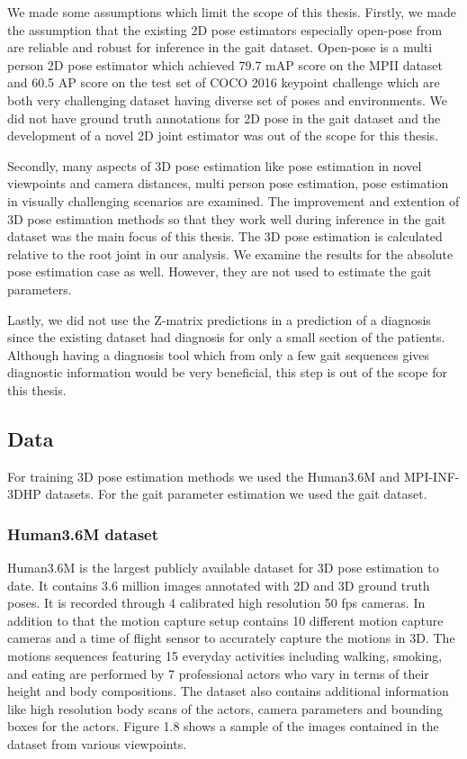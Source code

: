 We made some assumptions which limit the scope of this thesis. Firstly, we made the assumption that the existing 2D pose estimators especially open-pose from \parencite{cao2016realtime} are reliable and robust for inference in the gait dataset. Open-pose is a multi person 2D pose estimator which achieved 79.7 mAP score on the MPII dataset and 60.5 AP score on the test set of COCO 2016 keypoint challenge which are both very challenging dataset having diverse set of poses and environments. We did not have ground truth annotations for 2D pose in the gait dataset and the development of a novel 2D joint estimator was out of the scope for this thesis.

Secondly, many aspects of 3D pose estimation like pose estimation in novel viewpoints and camera distances, multi person pose estimation, pose estimation in visually challenging scenarios are examined. The improvement and extention of 3D pose estimation methods so that they work well during inference in the gait dataset was the main focus of this thesis. The 3D pose estimation is calculated relative to the root joint in our analysis. We examine the results for the absolute pose estimation case as well. However, they are not used to estimate the gait parameters.

Lastly, we did not use the Z-matrix predictions in a prediction of a diagnosis since the existing dataset had diagnosis for only a small section of the patients. Although having a diagnosis tool which from only a few gait sequences gives diagnostic information would be very beneficial, this step is out of the scope for this thesis.

\subsection{Data}

For training 3D pose estimation methods we used the Human3.6M \parencite{ionescu2014human3} and MPI-INF-3DHP \parencite{mehta2017monocular} datasets. For the gait parameter estimation we used the gait dataset.

\subsubsection{Human3.6M dataset}

Human3.6M is the largest publicly available dataset for 3D pose estimation to date. It contains 3.6 million images annotated with 2D and 3D ground truth poses. It is recorded through 4 calibrated high resolution 50 fps cameras. In addition to that the motion capture setup contains 10 different motion capture cameras and a time of flight sensor to accurately capture the motions in 3D. The motions sequences featuring 15 everyday activities including walking, smoking, and eating are performed by 7 professional actors who vary in terms of their height and body compositions. The dataset also contains additional information like high resolution body scans of the actors, camera parameters and bounding boxes for the actors. Figure 1.8 shows a sample of the images contained in the dataset from various viewpoints.

